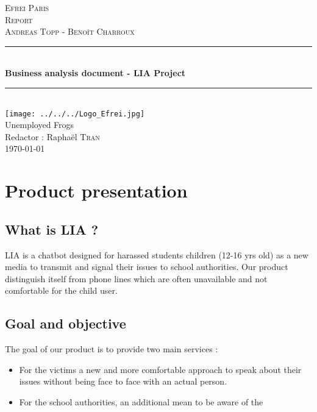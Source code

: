 \documentclass{article}
\newcommand{\HRule}{\rule{\linewidth}{0.5mm}}
\begin{document}
\begin{titlepage}
\center

 \LARGE \textsc{Efrei Paris}
\\[1.5cm]
\Large \textsc{Report}
\\[0.5cm]
\large \textsc{Andreas Topp - Benoît Charroux}
\\[0.5cm]
\HRule \\[0.4cm]
 {\Huge \bfseries Business analysis document - LIA Project}\\[0.4cm] %
\HRule \\[1.4cm]

\texttt{[image: ../../../Logo\_Efrei.jpg]}  \\[1cm]

{ \Large Unemployed Frogs}  \\[0.5cm]
{ \Large Redactor : Raphaël \textsc{Tran}}  \\[0.5cm]
{\large \today } \\[2pt]

\end{titlepage}

\tableofcontents
\newpage
\section{Product presentation}

\subsection{What is LIA ?}

LIA is a chatbot designed for harassed students children (12-16 yrs old) as a new media to transmit and signal their issues to school authorities. Our product distinguish itself from phone lines which are often unavailable and not comfortable for the child user.

\subsection{Goal and objective}

The goal of our product is to provide two main services :

\begin{itemize}
\item For the victims a new and more comfortable approach to speak about their issues without being face to face with an actual person.
\item For the school authorities, an additional mean to be aware of the 
\end{itemize} 
\end{document}
